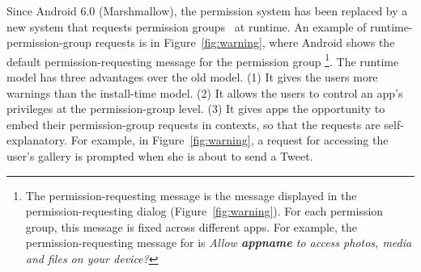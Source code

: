 \begin{figure}[t]
	\vspace{-0.1in}
	\centering
	\hfill
	\caption{\label{fig:intro}}
	\vspace{-4ex}
\end{figure}

Since Android 6.0 (Marshmallow), the permission system has been replaced by a new system that requests permission groups~\cite{permgroup} at runtime. An example of runtime-permission-group requests is in Figure~\ref{fig:warning}, where Android shows the default permission-requesting message for the permission group \footnote{The permission-requesting message is the message displayed in the permission-requesting dialog (Figure~\ref{fig:warning}). For each permission group, this message is fixed across different apps. For example, the permission-requesting message for  is \emph{Allow \textbf{appname} to access photos, media and files on your device?}}.
The runtime model has three advantages over the old model. 
(1) It gives the users more warnings than the install-time model. 
(2) It allows the users to control an app's privileges at the permission-group level. 
(3) It gives apps the opportunity to embed their permission-group requests in contexts, so that the requests are self-explanatory. 
For example, in Figure~\ref{fig:warning}, a request for accessing the user's gallery is prompted when she is about to send a Tweet. 


